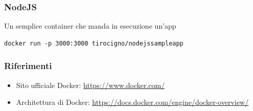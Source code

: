 \documentclass{beamer}
\begin{document}

\begin{frame}[fragile]
\frametitle{NodeJS}
\begin{block}{Un semplice container che manda in esecuzione un'app}
\begin{verbatim}
docker run -p 3000:3000 tirocigno/nodejssampleapp
\end{verbatim}
\end{block}
\end{frame}

\begin{frame}
\frametitle{Riferimenti}
\begin{itemize}
\item Sito ufficiale Docker: \href{https://www.docker.com/}{https://www.docker.com/}
\item Architettura di Docker: \href{https://docs.docker.com/engine/docker-overview/}{https://docs.docker.com/engine/docker-overview/}


\end{itemize}
\end{frame}




\begin{frame}
\titlepage %
\end{frame}

\end{document}
